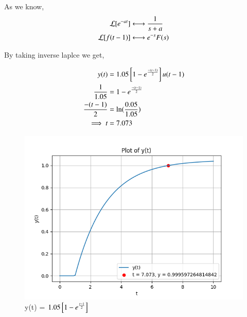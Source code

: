 \documentclass[journal,12pt,twocolumn]{IEEEtran}
\theoremstyle{remark}
\begin{document}
As we know,
\begin{align}
    \mathcal{L}[e^{-at}] &\system{} \frac{1}{s+a} \\
    \mathcal{L}[f(t-1)] &\system{} e^{-s}F(s)
\end{align}

By taking inverse laplce we get,

\begin{align}
    y(t) &= 1.05{}\left[1-e^{\frac{-(t-1)}{2}}\right]u(t-1) \\
    \frac{1}{1.05} &= 1-e^{\frac{-(t-1)}{2}} \\
    \frac{-(t-1)}{2} &= \ln(\frac{0.05}{1.05}) \\
    \implies t &= 7.073 
\end{align}

\begin{figure}[h]
    \centering
    \includegraphics[width=\columnwidth]{figs/fig1.png}
    \caption{y(t) = $1.05{}\left[1-e^{\frac{t-1}{2}}\right]$}
    \label{fig:gate23ch62}
\end{figure}
\end{document}
